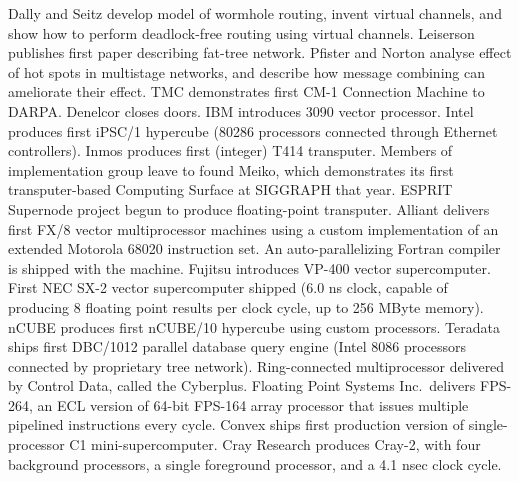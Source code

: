 	{Dally and Seitz develop model of wormhole routing,
	invent virtual channels, and show how to perform
	deadlock-free routing using virtual channels.}
	{Leiserson publishes first paper describing fat-tree network.}
	{Pfister and Norton analyse effect of hot spots
	in multistage networks,
	and describe how message combining can ameliorate their effect.}
	{TMC demonstrates first CM-1 Connection Machine to DARPA.}
	{Denelcor closes doors.}
	{IBM introduces 3090 vector processor.}
	{Intel produces first iPSC/1 hypercube
	(80286 processors connected through Ethernet controllers).}
	{Inmos produces first (integer) T414 transputer.
	Members of implementation group leave to found Meiko,
	which demonstrates its first transputer-based Computing Surface
	at SIGGRAPH that year.
	ESPRIT Supernode project begun to produce floating-point transputer.}
	{Alliant delivers first FX/8 vector multiprocessor machines 
	using a custom implementation of an
	extended Motorola 68020 instruction set.
	An auto-parallelizing Fortran compiler is shipped with the machine.}
	{Fujitsu introduces VP-400 vector supercomputer.}
	{First NEC SX-2 vector supercomputer shipped
	(6.0 ns clock,
	capable of producing 8 floating point results per clock cycle,
	up to 256 MByte memory).}
	{nCUBE produces first nCUBE/10 hypercube
	using custom processors.}
	{Teradata ships first DBC/1012 parallel database query engine
	(Intel 8086 processors connected by proprietary tree network).}
	{Ring-connected multiprocessor delivered by Control Data,
	called the Cyberplus.}
	{Floating Point Systems Inc.\ delivers FPS-264,
	an ECL version of 64-bit FPS-164 array processor that issues 
	multiple pipelined instructions every cycle.}
	{Convex ships first production version of
	single-processor C1 mini-supercomputer.}
	{Cray Research produces Cray-2,
	with four background processors,
	a single foreground processor,
	and a 4.1 nsec clock cycle.}
